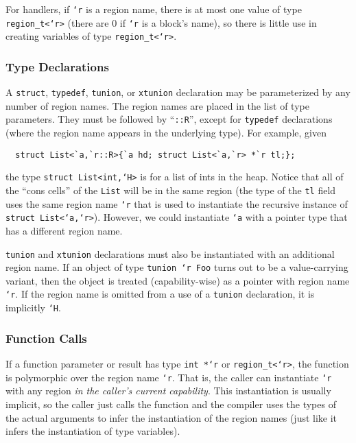 For handlers, if \texttt{`r} is a region name, there is at most one
value of type \texttt{region_t<`r>} (there are 0 if \texttt{`r} is a
block's name), so there is little use in creating variables of type
\texttt{region_t<`r>}.

\subsubsection{Type Declarations}

A \texttt{struct}, \texttt{typedef}, \texttt{tunion}, or \texttt{xtunion}
declaration may be parameterized by any number of region names.  The
region names are placed in the list of type parameters.  They must be
followed by ``\texttt{::R}'', except for \texttt{typedef} declarations
(where the region name appears in the underlying type).  
For example, given
\begin{verbatim}
  struct List<`a,`r::R>{`a hd; struct List<`a,`r> *`r tl;};
\end{verbatim}
the type \texttt{struct List<int,`H>} is for a list of ints in the heap.
Notice that all of the ``cons cells'' of the \texttt{List} will be in
the same region (the type of the \texttt{tl} field uses the same
region name \texttt{`r} that is used to instantiate the recursive
instance of \texttt{struct List<`a,`r>}).  However, we could instantiate
\texttt{`a} with a pointer type that has a different region name.

\texttt{tunion} and \texttt{xtunion} declarations must also be
instantiated with an additional region name.  If an object of type
\texttt{tunion `r Foo} turns out to be a value-carrying variant, then
the object is treated (capability-wise) as a pointer with region name
\texttt{`r}.  If the region name is omitted from a use of a
\texttt{tunion} declaration, it is implicitly \texttt{`H}.

\subsubsection{Function Calls}

If a function parameter or result has type \texttt{int *`r} or
\texttt{region_t<`r>}, the function is polymorphic over the region name
\texttt{`r}.  That is, the caller can instantiate \texttt{`r} with any
region \emph{in the caller's current capability}. This instantiation
is usually implicit, so the caller just calls the function and the
compiler uses the types of the actual arguments to infer the
instantiation of the region names (just like it infers the
instantiation of type variables).

